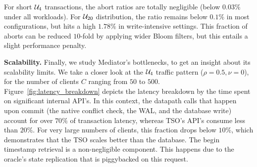 For short $\mathcal{U}_{4}$ transactions, the  abort ratios are totally negligible
(below $0.03\%$ under all workloads). For $\mathcal{U}_{20}$ distribution, the 
ratio remains below $0.1\%$ in most configurations, but hits a high $1.78\%$
in write-intensive settings. This fraction of aborts can be reduced $10$-fold 
by applying wider Bloom filters, but
this entails a slight performance penalty. %




{\bf Scalability.} Finally, we study Mediator's bottlenecks, to get an insight about its 
scalability limits. 
We take a closer look at the $\mathcal{U}_{4}$ traffic pattern ($\rho=0.5, \nu=0$), 
for the number of clients $C$ ranging from $50$ to $500$. 
Figure~\ref{fig:latency_breakdown} depicts the latency breakdown 
by the time spent on significant internal API's. In this context, the datapath 
calls that happen upon commit (the native conflict check, the WAL, and the database 
write) account for over $70\%$ of transaction latency, whereas TSO's API's consume 
less than $20\%$. For very large numbers of clients, this fraction drops below 
$10\%$, which demonstrates that the TSO scales better than the database. 
The begin timestamp retrieval %
is a non-negligible component. This happens due to the oracle's state replication that 
is piggybacked on this request. 

